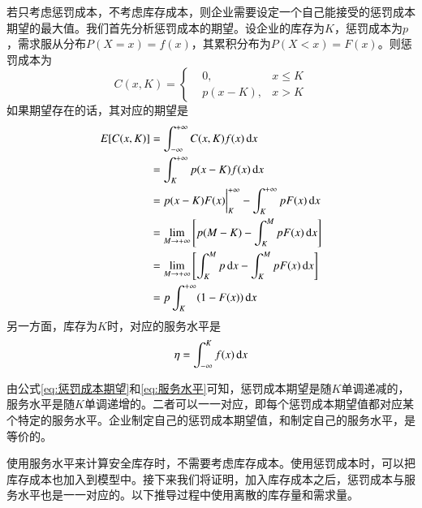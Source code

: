 若只考虑惩罚成本，不考虑库存成本，则企业需要设定一个自己能接受的惩罚成本期望的最大值。我们首先分析惩罚成本的期望。设企业的库存为$K$，惩罚成本为$p$，需求服从分布$P(X=x)=f(x)$，其累积分布为$P(X<x)=F(x)$。则惩罚成本为
\begin{equation}
C(x,K)=\left\{
\begin{aligned}
&0, &x \leq K \\
&p(x-K), &x > K
\end{aligned}
\right.
\label{eq:惩罚成本}
\end{equation}
如果期望存在的话，其对应的期望是
\begin{align}
E[C(x,K)] &= \int_{-\infty}^{+\infty}C(x,K)f(x)\operatorname{d\!} x\notag\\
&=\int_K^{+\infty}p(x-K)f(x)\operatorname{d\!} x\notag\\
&=p(x-K)F(x)\bigg|_K^{+\infty} - \int_K^{+\infty}pF(x)\operatorname{d\!} x\notag\\
&=\lim_{M\to+\infty}\left[p(M-K) - \int_K^MpF(x)\operatorname{d\!} x\right]\notag\\
&=\lim_{M\to+\infty}\left[\int_K^Mp\operatorname{d\!} x - \int_K^MpF(x)\operatorname{d\!} x\right]\notag\\
&=p\int_K^{+\infty}(1-F(x))\operatorname{d\!} x
\label{eq:惩罚成本期望}
\end{align}
另一方面，库存为$K$时，对应的服务水平是
\begin{equation}
\eta = \int_{-\infty}^Kf(x)\operatorname{d\!} x
\label{eq:服务水平}
\end{equation}

由公式\ref{eq:惩罚成本期望}和\ref{eq:服务水平}可知，惩罚成本期望是随$K$单调递减的，服务水平是随$K$单调递增的。二者可以一一对应，即每个惩罚成本期望值都对应某个特定的服务水平。企业制定自己的惩罚成本期望值，和制定自己的服务水平，是等价的。

使用服务水平来计算安全库存时，不需要考虑库存成本。使用惩罚成本时，可以把库存成本也加入到模型中。接下来我们将证明，加入库存成本之后，惩罚成本与服务水平也是一一对应的。以下推导过程中使用离散的库存量和需求量。

